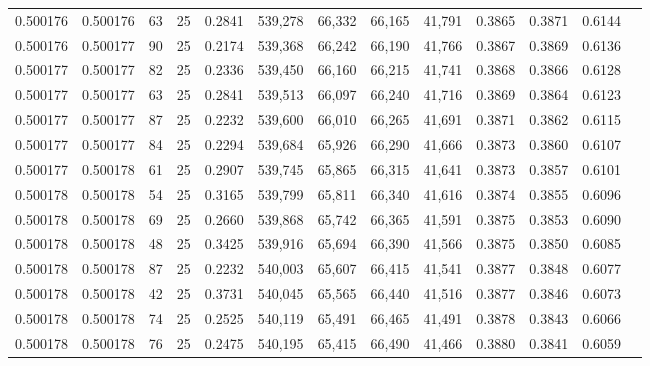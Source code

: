\begin{tabular}{rrrrrrrrrrrrr}
0.500176 & 0.500176 &    63 &  25 &                                     0.2841 & 539,278 &  66,332 &  66,165 &  41,791 & 0.3865 & 0.3871 & 0.6144 \\
0.500176 & 0.500177 &    90 &  25 &                                     0.2174 & 539,368 &  66,242 &  66,190 &  41,766 & 0.3867 & 0.3869 & 0.6136 \\
0.500177 & 0.500177 &    82 &  25 &                                     0.2336 & 539,450 &  66,160 &  66,215 &  41,741 & 0.3868 & 0.3866 & 0.6128 \\
0.500177 & 0.500177 &    63 &  25 &                                     0.2841 & 539,513 &  66,097 &  66,240 &  41,716 & 0.3869 & 0.3864 & 0.6123 \\
0.500177 & 0.500177 &    87 &  25 &                                     0.2232 & 539,600 &  66,010 &  66,265 &  41,691 & 0.3871 & 0.3862 & 0.6115 \\
0.500177 & 0.500177 &    84 &  25 &                                     0.2294 & 539,684 &  65,926 &  66,290 &  41,666 & 0.3873 & 0.3860 & 0.6107 \\
0.500177 & 0.500178 &    61 &  25 &                                     0.2907 & 539,745 &  65,865 &  66,315 &  41,641 & 0.3873 & 0.3857 & 0.6101 \\
0.500178 & 0.500178 &    54 &  25 &                                     0.3165 & 539,799 &  65,811 &  66,340 &  41,616 & 0.3874 & 0.3855 & 0.6096 \\
0.500178 & 0.500178 &    69 &  25 &                                     0.2660 & 539,868 &  65,742 &  66,365 &  41,591 & 0.3875 & 0.3853 & 0.6090 \\
0.500178 & 0.500178 &    48 &  25 &                                     0.3425 & 539,916 &  65,694 &  66,390 &  41,566 & 0.3875 & 0.3850 & 0.6085 \\
0.500178 & 0.500178 &    87 &  25 &                                     0.2232 & 540,003 &  65,607 &  66,415 &  41,541 & 0.3877 & 0.3848 & 0.6077 \\
0.500178 & 0.500178 &    42 &  25 &                                     0.3731 & 540,045 &  65,565 &  66,440 &  41,516 & 0.3877 & 0.3846 & 0.6073 \\
0.500178 & 0.500178 &    74 &  25 &                                     0.2525 & 540,119 &  65,491 &  66,465 &  41,491 & 0.3878 & 0.3843 & 0.6066 \\
0.500178 & 0.500178 &    76 &  25 &                                     0.2475 & 540,195 &  65,415 &  66,490 &  41,466 & 0.3880 & 0.3841 & 0.6059 \\

\end{tabular}
